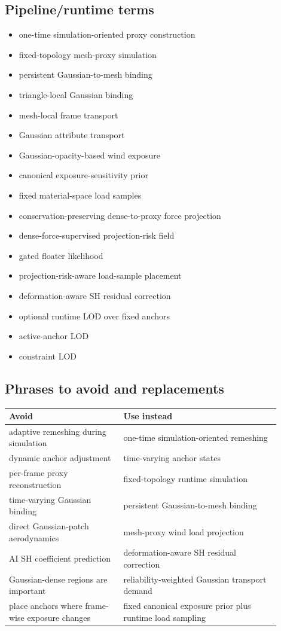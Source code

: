 \documentclass[11pt,a4paper]{article}
\begin{document}
\subsection{Pipeline/runtime terms}

\begin{itemize}[leftmargin=2em]
\item one-time simulation-oriented proxy construction
\item fixed-topology mesh-proxy simulation
\item persistent Gaussian-to-mesh binding
\item triangle-local Gaussian binding
\item mesh-local frame transport
\item Gaussian attribute transport
\item Gaussian-opacity-based wind exposure
\item canonical exposure-sensitivity prior
\item fixed material-space load samples
\item conservation-preserving dense-to-proxy force projection
\item dense-force-supervised projection-risk field
\item gated floater likelihood
\item projection-risk-aware load-sample placement
\item deformation-aware SH residual correction
\item optional runtime LOD over fixed anchors
\item active-anchor LOD
\item constraint LOD
\end{itemize}

\subsection{Phrases to avoid and replacements}

\begin{longtable}{>{\raggedright\arraybackslash}p{0.38\linewidth} >{\raggedright\arraybackslash}p{0.52\linewidth}}
\toprule
Avoid & Use instead \\
\midrule
adaptive remeshing during simulation & one-time simulation-oriented remeshing \\
dynamic anchor adjustment & time-varying anchor states \\
per-frame proxy reconstruction & fixed-topology runtime simulation \\
time-varying Gaussian binding & persistent Gaussian-to-mesh binding \\
direct Gaussian-patch aerodynamics & mesh-proxy wind load projection \\
AI SH coefficient prediction & deformation-aware SH residual correction \\
Gaussian-dense regions are important & reliability-weighted Gaussian transport demand \\
place anchors where frame-wise exposure changes & fixed canonical exposure prior plus runtime load sampling \\
\bottomrule
\end{longtable}
\end{document}
